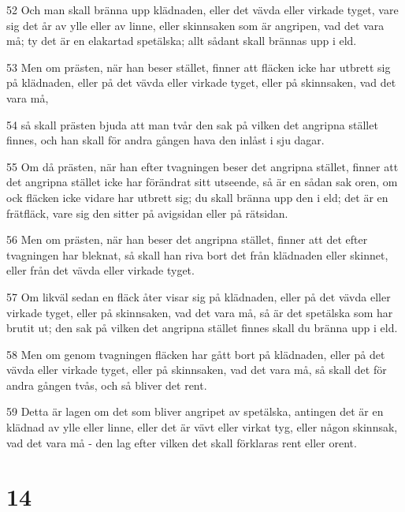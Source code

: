 \par 52 Och man skall bränna upp klädnaden, eller det vävda eller virkade tyget, vare sig det år av ylle eller av linne, eller skinnsaken som är angripen, vad det vara må; ty det är en elakartad spetälska; allt sådant skall brännas upp i eld.
\par 53 Men om prästen, när han beser stället, finner att fläcken icke har utbrett sig på klädnaden, eller på det vävda eller virkade tyget, eller på skinnsaken, vad det vara må,
\par 54 så skall prästen bjuda att man tvår den sak på vilken det angripna stället finnes, och han skall för andra gången hava den inlåst i sju dagar.
\par 55 Om då prästen, när han efter tvagningen beser det angripna stället, finner att det angripna stället icke har förändrat sitt utseende, så är en sådan sak oren, om ock fläcken icke vidare har utbrett sig; du skall bränna upp den i eld; det är en frätfläck, vare sig den sitter på avigsidan eller på rätsidan.
\par 56 Men om prästen, när han beser det angripna stället, finner att det efter tvagningen har bleknat, så skall han riva bort det från klädnaden eller skinnet, eller från det vävda eller virkade tyget.
\par 57 Om likväl sedan en fläck åter visar sig på klädnaden, eller på det vävda eller virkade tyget, eller på skinnsaken, vad det vara må, så är det spetälska som har brutit ut; den sak på vilken det angripna stället finnes skall du bränna upp i eld.
\par 58 Men om genom tvagningen fläcken har gått bort på klädnaden, eller på det vävda eller virkade tyget, eller på skinnsaken, vad det vara må, så skall det för andra gången tvås, och så bliver det rent.
\par 59 Detta är lagen om det som bliver angripet av spetälska, antingen det är en klädnad av ylle eller linne, eller det är vävt eller virkat tyg, eller någon skinnsak, vad det vara må - den lag efter vilken det skall förklaras rent eller orent.

\chapter{14}

